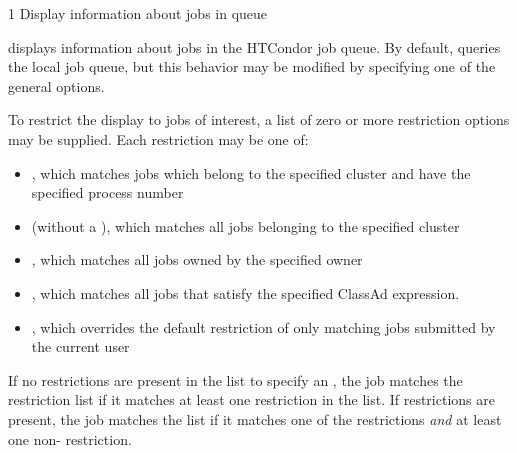 \begin{ManPage}{\label{man-condor-q}}{1}
{Display information about jobs in queue}


\Synopsis {}

\ToolDebugOption
{}

\Description
{} displays information about jobs in the HTCondor job queue.  By
default,  queries the local job queue,
but this behavior may be 
modified by specifying one of the general options.


To restrict the display to jobs of interest, a list of zero or more 
restriction options may be supplied.  Each restriction may be one of:
\begin{itemize}
	\item {}, which matches jobs which
		belong to the specified cluster and have the specified process number
	\item {} (without a ), which matches all jobs belonging
		to the specified cluster
	\item {}, which matches all jobs owned by the specified owner
	\item {}, which matches all jobs that
		satisfy the specified ClassAd expression. 
	\item {}, which overrides the default
		restriction of only matching jobs submitted by the
		current user
\end{itemize}
If no restrictions are present in the list to specify an
, the job matches the 
restriction list if it matches at least one restriction in the list.  If 
 restrictions are present, the job matches the list if it matches 
one of the  restrictions \emph{and} at least one non- 
restriction.


\end{ManPage}
